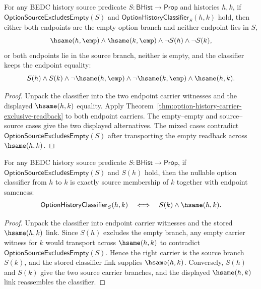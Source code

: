 \begin{theorem}
\label{thm:option-history-classifier-exclusive-readback}
For any BEDC history source predicate $S:\mathsf{BHist}\to\mathsf{Prop}$ and
histories $h,k$, if $\mathsf{OptionSourceExcludesEmpty}(S)$ and
$\mathsf{OptionHistoryClassifier}_S(h,k)$ hold, then either both endpoints are
the empty option branch and neither endpoint lies in $S$,
$$
\hsame(h,\emp)\land\hsame(k,\emp)\land\neg S(h)\land\neg S(k),
$$
or both endpoints lie in the source branch, neither is empty, and the classifier
keeps the endpoint equality:
$$
S(h)\land S(k)\land\neg\hsame(h,\emp)\land\neg\hsame(k,\emp)\land\hsame(h,k).
$$
\end{theorem}
\begin{proof}
Unpack the classifier into the two endpoint carrier witnesses and the displayed
$\hsame(h,k)$ equality. Apply Theorem~\ref{thm:option-history-carrier-exclusive-readback}
to both endpoint carriers. The empty--empty and source--source cases give the
two displayed alternatives. The mixed cases contradict
$\mathsf{OptionSourceExcludesEmpty}(S)$ after transporting the empty readback
across $\hsame(h,k)$.
\end{proof}

\begin{theorem}
\label{thm:option-history-classifier-source-left-exactness}
For any BEDC history source predicate $S:\mathsf{BHist}\to\mathsf{Prop}$,
if $\mathsf{OptionSourceExcludesEmpty}(S)$ and $S(h)$ hold, then the nullable
option classifier from $h$ to $k$ is exactly source membership of $k$ together
with endpoint sameness:
$$
\mathsf{OptionHistoryClassifier}_S(h,k)
\quad\Longleftrightarrow\quad
S(k)\land\hsame(h,k).
$$
\end{theorem}
\begin{proof}
Unpack the classifier into endpoint carrier witnesses and the stored
$\hsame(h,k)$ link. Since $S(h)$ excludes the empty branch, any empty carrier
witness for $k$ would transport across $\hsame(h,k)$ to contradict
$\mathsf{OptionSourceExcludesEmpty}(S)$. Hence the right carrier is the source
branch $S(k)$, and the stored classifier link supplies $\hsame(h,k)$. Conversely,
$S(h)$ and $S(k)$ give the two source carrier branches, and the displayed
$\hsame(h,k)$ link reassembles the classifier.
\end{proof}

